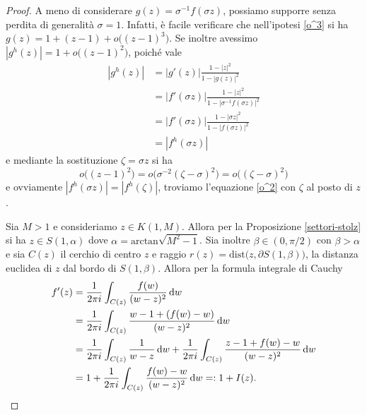 \begin{proof}
  A meno di considerare $g(z)=\sigma^{-1}f(\sigma z)$, possiamo supporre senza perdita di generalità $\sigma=1$. Infatti, è facile verificare che nell'ipotesi \eqref{o^3} si ha $g(z)=1+(z-1)+o\bigl((z-1)^3\bigr)$. Se inoltre avessimo $|g^h(z)|=1+o\bigl((z-1)^2\bigr)$, poiché vale
  \begin{align*}
    |g^h(z)| & =|g'(z)|\frac{1-|z|^2}{1-|g(z)|^2} \\
    & =|f'(\sigma z)|\frac{1-|z|^2}{1-|\sigma^{-1}f(\sigma z)|^2} \\
    & =|f'(\sigma z)|\frac{1-|\sigma z|^2}{1-|f(\sigma z)|^2} \\
    & =|f^h(\sigma z)|
  \end{align*}
  e mediante la sostituzione $\zeta=\sigma z$ si ha
  $$o\bigl((z-1)^2\bigr)=o\bigl(\sigma^{-2}(\zeta-\sigma)^2\bigr)=o\bigl((\zeta-\sigma)^2\bigr)$$
  e ovviamente $|f^h(\sigma z)|=|f^h(\zeta)|$, troviamo l'equazione \eqref{o^2} con $\zeta$ al posto di $z$.

  Sia $M>1$ e consideriamo $z \in K(1,M)$. Allora per la Proposizione \ref{settori-stolz} si ha $z \in S(1,\alpha)$ dove $\alpha=\text{arctan}\sqrt{M^2-1}$.
  Sia inoltre $\beta \in (0,\pi/2)$ con $\beta>\alpha$ e sia $C(z)$ il cerchio di centro $z$ e raggio $r(z)=\text{dist}\bigl(z, \partial S(1,\beta)\bigr)$, la distanza euclidea di $z$ dal bordo di $S(1,\beta)$. Allora per la formula integrale di Cauchy
  \begin{align*}
    f'(z) & =\frac{1}{2\pi i} \int_{C(z)} \frac{f(w)}{(w-z)^2}\mathop{}\!\mathrm{d} w \\
    & =\frac{1}{2\pi i} \int_{C(z)} \frac{w-1+(f(w)-w)}{(w-z)^2}\mathop{}\!\mathrm{d} w \\
    & =\frac{1}{2\pi i} \int_{C(z)} \frac{1}{w-z}\mathop{}\!\mathrm{d} w+\frac{1}{2\pi i} \int_{C(z)} \frac{z-1+f(w)-w}{(w-z)^2}\mathop{}\!\mathrm{d} w \\
    & =1+\frac{1}{2\pi i} \int_{C(z)} \frac{f(w)-w}{(w-z)^2}\mathop{}\!\mathrm{d} w=:1+I(z).
  \end{align*}


\end{proof}
